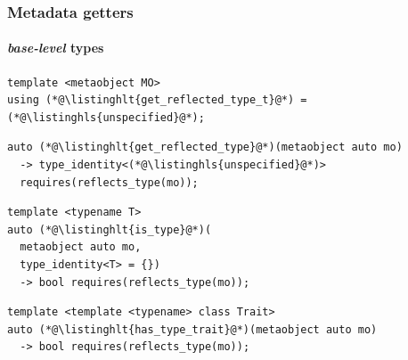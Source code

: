 \documentclass[aspectratio=169,compress,table,xcolor=table]{beamer}
\begin{document}
\begin{frame}[fragile]
  \frametitle{Metadata getters}
  \framesubtitle{{\em base-level} types}
 \begin{lstlisting}[language=c++2x,basicstyle=\small\ttfamily]
template <metaobject MO>
using (*@\listinghlt{get_reflected_type_t}@*) = (*@\listinghls{unspecified}@*);
  \end{lstlisting}
  \vfill
  \begin{lstlisting}[language=c++2x,basicstyle=\small\ttfamily]
auto (*@\listinghlt{get_reflected_type}@*)(metaobject auto mo)
  -> type_identity<(*@\listinghls{unspecified}@*)>
  requires(reflects_type(mo));
  \end{lstlisting}
  \vfill
  \begin{lstlisting}[language=c++2x,basicstyle=\small\ttfamily]
template <typename T>
auto (*@\listinghlt{is_type}@*)(
  metaobject auto mo,
  type_identity<T> = {})
  -> bool requires(reflects_type(mo));
  \end{lstlisting}
  \vfill
  \begin{lstlisting}[language=c++2x,basicstyle=\small\ttfamily]
template <template <typename> class Trait>
auto (*@\listinghlt{has_type_trait}@*)(metaobject auto mo)
  -> bool requires(reflects_type(mo));
  \end{lstlisting}
\end{frame}
\end{document}

